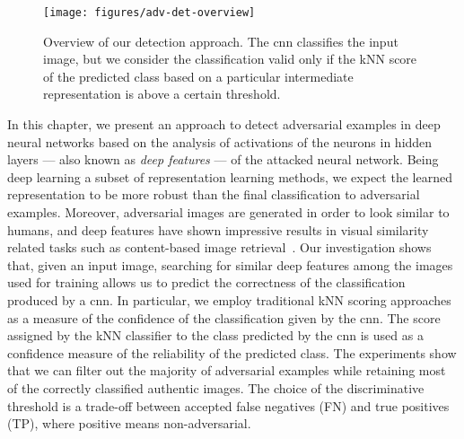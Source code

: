 \begin{figure}
\centering
\texttt{[image: figures/adv-det-overview]}
\caption{Overview of our detection approach.
The \gls{cnn} classifies the input image, but we consider the classification valid only if the kNN score of the predicted class based on a particular intermediate representation is above a certain threshold.}
\label{fig:adv:overview}
\end{figure}

In this chapter, we present an approach to detect adversarial examples in deep neural networks based on the analysis of activations of the neurons in hidden layers --- also known as \emph{deep features} --- of the attacked neural network.
Being deep learning a subset of representation learning methods, we expect the learned representation to be more robust than the final classification to adversarial examples.
Moreover, adversarial images are generated in order to look similar to humans, and deep features have shown impressive results in visual similarity related tasks such as content-based image retrieval~\cite{sharif2014cnn,gordo2016deep}.
Our investigation shows that, given an input image, searching for similar deep features among the images used for training allows us to predict the correctness of the classification produced by a \gls{cnn}.
In particular, we employ traditional kNN scoring approaches as a measure of the confidence of the classification given by the \gls{cnn}.
The score assigned by the kNN classifier to the class predicted by the \gls{cnn} is used as a confidence measure of the reliability of the predicted class.
The experiments show that we can filter out the majority of adversarial examples while retaining most of the correctly classified authentic images.
The choice of the discriminative threshold is a trade-off between accepted false negatives (FN) and true positives (TP), where positive means non-adversarial.
%

